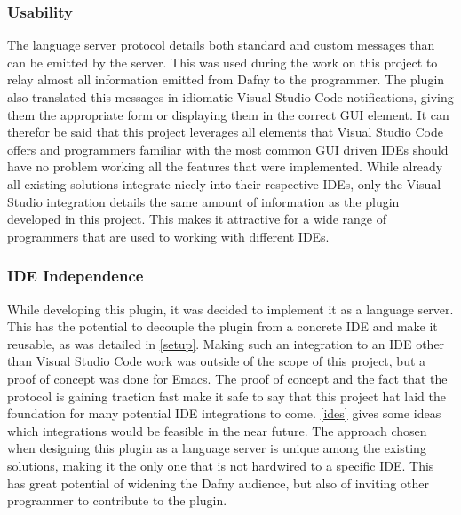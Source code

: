 \subsubsection{Usability}
The language server protocol details both standard and custom messages than can be emitted by the server. This was used during the work on this project to relay almost all information emitted from Dafny to the programmer. The plugin also translated this messages in idiomatic Visual Studio Code notifications, giving them the appropriate form or displaying them in the correct GUI element. It can therefor be said that this project leverages all elements that Visual Studio Code offers and programmers familiar with the most common GUI driven IDEs should have no problem working all the features that were implemented. \newline
While already all existing solutions integrate nicely into their respective IDEs, only the Visual Studio integration details the same amount of information as the plugin developed in this project. This makes it attractive for a wide range of programmers that are used to working with different IDEs. 
\subsubsection{IDE Independence}
While developing this plugin, it was decided to implement it as a language server. This has the potential to decouple the plugin from a concrete IDE and make it reusable, as was detailed in \ref{setup}. Making such an integration to an IDE other than Visual Studio Code work was outside of the scope of this project, but a proof of concept was done for Emacs. \newline
The proof of concept and the fact that the protocol is gaining traction fast make it safe to say that this project hat laid the foundation for many potential IDE integrations to come. \ref{ides} gives some ideas which integrations would be feasible in the near future. \newline
The approach chosen when designing this plugin as a language server is unique among the existing solutions, making it the only one that is not hardwired to a specific IDE. This has great potential of widening the Dafny audience, but also of inviting other programmer to contribute to the plugin.
